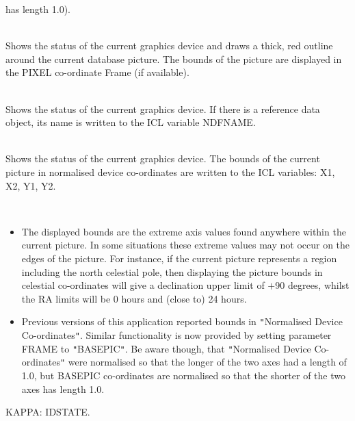 \documentclass[twoside,11pt]{article}
\newcommand{\sstexamplesubsection}[2]{\sloppy \item{\ssttt #1} \mbox{} \\ #2 }
\newcommand{\sstnotes}[1]{\pagebreak[3] \item[Notes:] \mbox{} \\[1.3ex] #1}
\newcommand{\sstdiytopic}[2]{\goodbreak \item[{\hspace{-0.35em}#1\hspace{-0.35em}:}] \mbox{} \\[1.3ex] #2}
\newenvironment{sstitemize}{%
  \vspace{-4.3ex}\begin{itemize}}{\end{itemize}}
\newcommand{\sstitemlist}[1]{
  \mbox{} \\
  \vspace{-3.5ex}
  \begin{sstitemize}
     #1
  \end{sstitemize}
}
\newcommand{\sstitem}{\item}
\newcommand{\ssttt}{\tt}
\renewcommand{\sstexamplesubsection}[2]{\item[{\ssttt #1}] \\ #2}
\renewcommand{\sstnotes}[1]{\item[Notes:]
      \begin{description}
         #1
      \end{description}
   }
\renewcommand{\sstdiytopic}[2]{\item[{#1}]
      \begin{description}
         #2
      \end{description}
   }
\newcommand{\sstitemlist}[1]{
      \begin{itemize}
         #1
      \end{itemize}
   }
\begin{document}
{{{         has length 1.0).
      }
      \sstexamplesubsection{
         idstate outline frame=pixel style={\tt "}{\tt '}colour=red,width=3{\tt '}{\tt "}
      }{
         Shows the status of the current graphics device and draws a
         thick, red outline around the current database picture. The
         bounds of the picture are displayed in the PIXEL co-ordinate
         Frame (if available).
      }
      \sstexamplesubsection{
         idstate refnam=(ndfname)
      }{
         Shows the status of the current graphics device.  If there
         is a reference data object, its name is written to the ICL
         variable NDFNAME.
      }
      \sstexamplesubsection{
         idstate x1=(x1) x2=(x2) y1=(y1) y2=(y2) frame=basepic
      }{
         Shows the status of the current graphics device.  The bounds
         of the current picture in normalised device co-ordinates
         are written to the ICL variables: X1, X2, Y1, Y2.
      }
   }
   \sstnotes{
      \sstitemlist{

         \sstitem
         The displayed bounds are the extreme axis values found anywhere
         within the current picture. In some situations these extreme
         values may not occur on the edges of the picture. For instance, if
         the current picture represents a region including the north
         celestial pole, then displaying the picture bounds in celestial
         co-ordinates will give a declination upper limit of $+$90 degrees,
         whilst the RA limits will be 0 hours and (close to) 24 hours.

         \sstitem
         Previous versions of this application reported bounds in
         {\tt "}Normalised Device Co-ordinates{\tt "}. Similar functionality is now
         provided by setting parameter FRAME to {\tt "}BASEPIC{\tt "}. Be aware though,
         that {\tt "}Normalised Device Co-ordinates{\tt "} were normalised so that the
         longer of the two axes had a length of 1.0, but BASEPIC co-ordinates
         are normalised so that the shorter of the two axes has length 1.0.
      }
   }
   \sstdiytopic{
      Related Applications
   }{
      KAPPA: IDSTATE.
   }
}
\end{document}

